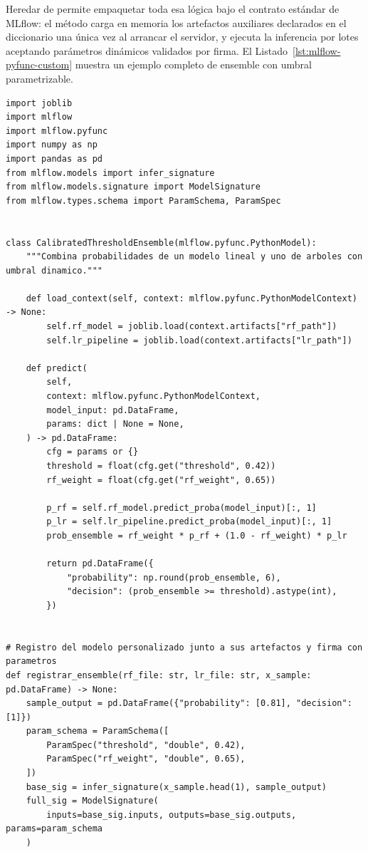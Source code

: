 Heredar de  permite empaquetar toda esa lógica bajo el contrato estándar de MLflow: el método  carga en memoria los artefactos auxiliares declarados en el diccionario  una única vez al arrancar el servidor, y  ejecuta la inferencia por lotes aceptando parámetros dinámicos validados por firma. El Listado~\ref{lst:mlflow-pyfunc-custom} muestra un ejemplo completo de ensemble con umbral parametrizable.

\begin{lstlisting}[style=python, caption={Implementación y registro de un modelo personalizado con mlflow.pyfunc que combina dos modelos y aplica un umbral de decisión configurable.}, label={lst:mlflow-pyfunc-custom}]
import joblib
import mlflow
import mlflow.pyfunc
import numpy as np
import pandas as pd
from mlflow.models import infer_signature
from mlflow.models.signature import ModelSignature
from mlflow.types.schema import ParamSchema, ParamSpec


class CalibratedThresholdEnsemble(mlflow.pyfunc.PythonModel):
    """Combina probabilidades de un modelo lineal y uno de arboles con umbral dinamico."""

    def load_context(self, context: mlflow.pyfunc.PythonModelContext) -> None:
        self.rf_model = joblib.load(context.artifacts["rf_path"])
        self.lr_pipeline = joblib.load(context.artifacts["lr_path"])

    def predict(
        self,
        context: mlflow.pyfunc.PythonModelContext,
        model_input: pd.DataFrame,
        params: dict | None = None,
    ) -> pd.DataFrame:
        cfg = params or {}
        threshold = float(cfg.get("threshold", 0.42))
        rf_weight = float(cfg.get("rf_weight", 0.65))

        p_rf = self.rf_model.predict_proba(model_input)[:, 1]
        p_lr = self.lr_pipeline.predict_proba(model_input)[:, 1]
        prob_ensemble = rf_weight * p_rf + (1.0 - rf_weight) * p_lr

        return pd.DataFrame({
            "probability": np.round(prob_ensemble, 6),
            "decision": (prob_ensemble >= threshold).astype(int),
        })


# Registro del modelo personalizado junto a sus artefactos y firma con parametros
def registrar_ensemble(rf_file: str, lr_file: str, x_sample: pd.DataFrame) -> None:
    sample_output = pd.DataFrame({"probability": [0.81], "decision": [1]})
    param_schema = ParamSchema([
        ParamSpec("threshold", "double", 0.42),
        ParamSpec("rf_weight", "double", 0.65),
    ])
    base_sig = infer_signature(x_sample.head(1), sample_output)
    full_sig = ModelSignature(
        inputs=base_sig.inputs, outputs=base_sig.outputs, params=param_schema
    )


\end{lstlisting}

